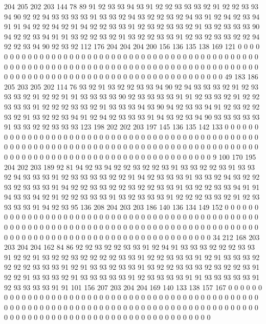 204 205 202 203 144 78 89 91 92 93 93 94 93 91 92 92 93 93 93 92
91 92 92 93 93 94 90 92 92 94 93 93 93 93 91 93 93 92 94 93
92 92 93 92 94 93 91 92 94 92 93 94 91 91 94 92 92 94 92 91
94 92 92 93 93 91 92 93 92 93 93 92 91 93 92 93 93 93 90 94
92 92 93 94 91 91 93 92 92 93 92 91 93 92 92 93 93 91 92 93
92 93 93 92 92 94 92 92 93 94 90 92 93 92 112 176 204 204 204 200
156 136 135 138 169 121 0 0 0 0 0 0 0 0 0 0 0 0 0 0
0 0 0 0 0 0 0 0 0 0 0 0 0 0 0 0 0 0 0 0
0 0 0 0 0 0 0 0 0 0 0 0 0 0 0 0 0 0 0 0
0 0 0 0 0 0 0 0 0 0 0 0 0 0 0 0 0 0 0 0
0 0 0 0 0 0 0 0 0 0 0 0 0 0 0 0 0 0 0 0
0 0 0 0 0 0 0 0 0 0 0 0 0 0 0 0 0 0 0 0
0 0 0 0 0 0 0 0 0 0 0 0 0 49 183 186 205 203 205 202
114 76 93 92 91 93 92 92 93 93 94 90 92 94 93 93 93 92 91 92
93 93 93 92 91 92 92 91 91 93 93 93 93 90 92 93 93 93 93 91
91 92 93 93 92 91 92 92 93 93 93 91 92 92 92 93 93 92 91 93
93 93 94 93 90 94 92 93 93 94 91 92 93 92 92 93 92 91 93 92
92 93 94 91 92 94 92 93 93 93 91 94 93 92 93 94 90 93 93 93
93 93 91 93 93 92 92 93 93 93 123 198 202 202 203 197 145 136 135 142
133 0 0 0 0 0 0 0 0 0 0 0 0 0 0 0 0 0 0 0
0 0 0 0 0 0 0 0 0 0 0 0 0 0 0 0 0 0 0 0
0 0 0 0 0 0 0 0 0 0 0 0 0 0 0 0 0 0 0 0
0 0 0 0 0 0 0 0 0 0 0 0 0 0 0 0 0 0 0 0
0 0 0 0 0 0 0 0 0 0 0 0 0 0 0 0 0 0 0 0
0 0 0 0 0 0 0 0 0 0 0 0 0 0 0 0 0 0 0 0
0 0 0 0 0 0 0 0 9 100 170 195 204 202 203 189 92 81 94 92
93 94 92 92 93 92 92 93 91 93 93 92 92 93 91 93 93 92 94 93
93 93 91 92 93 93 93 93 92 92 91 94 92 93 93 93 91 93 93 92
94 93 92 92 93 92 93 93 93 91 94 92 92 93 93 92 92 93 92 92
93 93 91 93 92 92 93 93 94 91 91 94 93 93 94 92 91 92 92 93
93 93 91 93 92 93 93 93 91 92 92 92 93 93 92 91 92 93 93 93
93 91 94 92 93 95 136 208 204 203 203 186 140 136 134 149 152 0 0 0
0 0 0 0 0 0 0 0 0 0 0 0 0 0 0 0 0 0 0 0
0 0 0 0 0 0 0 0 0 0 0 0 0 0 0 0 0 0 0 0
0 0 0 0 0 0 0 0 0 0 0 0 0 0 0 0 0 0 0 0
0 0 0 0 0 0 0 0 0 0 0 0 0 0 0 0 0 0 0 0
0 0 0 0 0 0 0 0 0 0 0 0 0 0 0 0 0 0 0 0
0 0 0 0 0 0 0 0 0 0 0 0 0 0 0 0 0 0 0 0
0 0 0 0 34 212 168 203 203 204 204 162 84 86 92 92 93 92 92 93
93 91 92 94 91 93 93 93 92 92 92 93 93 91 92 92 91 93 92 92
93 92 92 92 92 93 93 91 92 92 93 93 93 91 92 91 93 93 93 92
92 92 92 93 93 93 91 92 91 93 93 92 93 93 91 93 92 92 93 93
93 92 93 92 92 93 91 92 92 91 93 93 93 92 91 93 93 93 93 93
91 92 93 93 93 93 91 91 93 93 93 93 93 91 92 93 93 93 93 91
91 101 156 207 203 204 204 169 140 133 138 157 167 0 0 0 0 0 0 0
0 0 0 0 0 0 0 0 0 0 0 0 0 0 0 0 0 0 0 0
0 0 0 0 0 0 0 0 0 0 0 0 0 0 0 0 0 0 0 0
0 0 0 0 0 0 0 0 0 0 0 0 0 0 0 0 0 0 0 0
0 0 0 0 0 0 0 0 0 0 0 0 0 0 0 0 0 0 0 0
0 0 0 0 0 0 0 0 0 0 0 0 0 0 0 0 0 0 0 0
0 0 0 0 0 0 0 0 0 0 0 0 0 0 0 0 0 0 0 0
